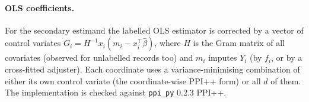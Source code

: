 \paragraph{OLS coefficients.}
For the secondary estimand the labelled OLS estimator is corrected by a vector of control variates
$G_i=H^{-1}x_i(m_i-x_i^\top\hat\beta)$, where $H$ is the Gram matrix of all covariates (observed for unlabelled records too)
and $m_i$ imputes $Y_i$ (by $f_i$, or by a cross-fitted adjuster). Each coordinate uses a variance-minimising combination of
either its own control variate (the coordinate-wise PPI++ form) or all $d$ of them. The implementation is checked against
\texttt{ppi\_py} 0.2.3 PPI++.
